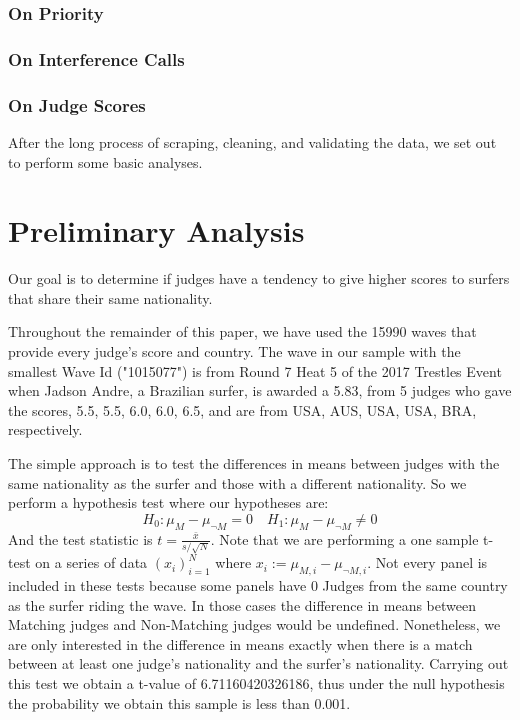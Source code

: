 \documentclass{article}
\begin{document}
\subsubsection{On Priority}
\subsubsection{On Interference Calls}
\subsubsection{On Judge Scores}

After the long process of scraping, cleaning, and validating the data, we set out to perform some basic analyses.

\section{Preliminary Analysis}
Our goal is to determine if judges have a tendency to give higher scores to surfers that share their same nationality.

Throughout the remainder of this paper, we have used the 15990 waves that provide every judge's score and country. The wave in our sample with the smallest Wave Id ("1015077") is from Round 7 Heat 5 of the 2017 Trestles Event when Jadson Andre, a Brazilian surfer, is awarded a 5.83, from 5 judges who gave the scores, 5.5, 5.5, 6.0, 6.0, 6.5, and are from USA, AUS, USA, USA, BRA, respectively.

The simple approach is to test the differences in means between judges with the same nationality as the surfer and those with a different nationality. So we perform a hypothesis test where our hypotheses are:
\[ H_0: \mu_M  - \mu_{\neg M} = 0  \quad H_1: \mu_M -\mu_{\neg M} \neq 0 \]
And the test statistic is $ t = \frac{\bar{x}}{s/\sqrt{N}} $. Note that we are performing a one sample t-test on a series of data $(x_i)_{i=1}^N$ where $x_i := \mu_{M,i}  - \mu_{\neg M,i}$.  Not every panel is included in these tests because some panels have 0 Judges from the same country as the surfer riding the wave. In those cases the difference in means between Matching judges and Non-Matching judges would be undefined. Nonetheless, we are only interested in the difference in means exactly when there is a match between at least one judge's nationality and the surfer's nationality. Carrying out this test we obtain a t-value of 6.71160420326186, thus under the null hypothesis the probability we obtain this sample is less than 0.001. 
\end{document}
